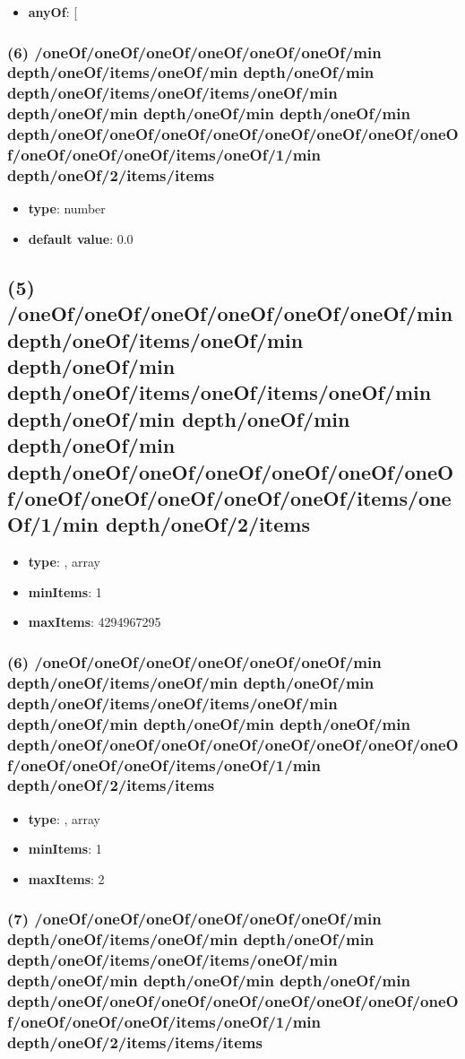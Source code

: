 \begin{itemize}[leftmargin=6em]\item {\bf anyOf}: [\end{itemize}\subsubsection{(6) /oneOf/oneOf/oneOf/oneOf/oneOf/oneOf/min depth/oneOf/items/oneOf/min depth/oneOf/min depth/oneOf/items/oneOf/items/oneOf/min depth/oneOf/min depth/oneOf/min depth/oneOf/min depth/oneOf/oneOf/oneOf/oneOf/oneOf/oneOf/oneOf/oneOf/oneOf/oneOf/oneOf/items/oneOf/1/min depth/oneOf/2/items/items}
\begin{itemize}[leftmargin=6em]\item {\bf type}: number\item {\bf default value}: 0.0
\end{itemize}\subsection{(5) /oneOf/oneOf/oneOf/oneOf/oneOf/oneOf/min depth/oneOf/items/oneOf/min depth/oneOf/min depth/oneOf/items/oneOf/items/oneOf/min depth/oneOf/min depth/oneOf/min depth/oneOf/min depth/oneOf/oneOf/oneOf/oneOf/oneOf/oneOf/oneOf/oneOf/oneOf/oneOf/oneOf/items/oneOf/1/min depth/oneOf/2/items}
\begin{itemize}[leftmargin=5em]\item {\bf type}: , array\item {\bf minItems}: 1
\item {\bf maxItems}: 4294967295
\end{itemize}\subsubsection{(6) /oneOf/oneOf/oneOf/oneOf/oneOf/oneOf/min depth/oneOf/items/oneOf/min depth/oneOf/min depth/oneOf/items/oneOf/items/oneOf/min depth/oneOf/min depth/oneOf/min depth/oneOf/min depth/oneOf/oneOf/oneOf/oneOf/oneOf/oneOf/oneOf/oneOf/oneOf/oneOf/oneOf/items/oneOf/1/min depth/oneOf/2/items/items}
\begin{itemize}[leftmargin=6em]\item {\bf type}: , array\item {\bf minItems}: 1
\item {\bf maxItems}: 2
\end{itemize}\subsubsection{(7) /oneOf/oneOf/oneOf/oneOf/oneOf/oneOf/min depth/oneOf/items/oneOf/min depth/oneOf/min depth/oneOf/items/oneOf/items/oneOf/min depth/oneOf/min depth/oneOf/min depth/oneOf/min depth/oneOf/oneOf/oneOf/oneOf/oneOf/oneOf/oneOf/oneOf/oneOf/oneOf/oneOf/items/oneOf/1/min depth/oneOf/2/items/items/items}
